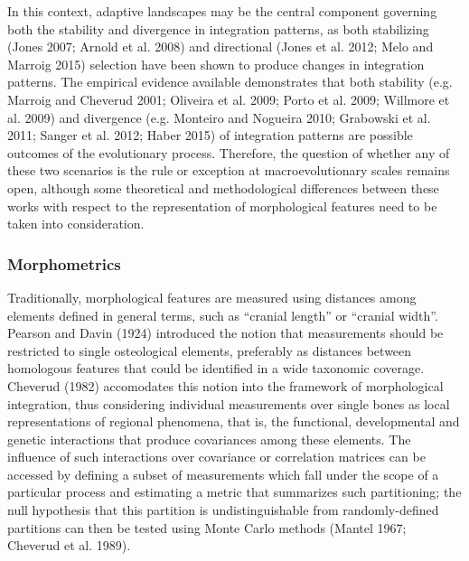 \documentclass[12pt,]{article}
\begin{document}
In this context, adaptive landscapes may be the central component
governing both the stability and divergence in integration patterns, as
both stabilizing (Jones 2007; Arnold et al. 2008) and directional (Jones
et al. 2012; Melo and Marroig 2015) selection have been shown to produce
changes in integration patterns. The empirical evidence available
demonstrates that both stability (e.g. Marroig and Cheverud 2001;
Oliveira et al. 2009; Porto et al. 2009; Willmore et al. 2009) and
divergence (e.g. Monteiro and Nogueira 2010; Grabowski et al. 2011;
Sanger et al. 2012; Haber 2015) of integration patterns are possible
outcomes of the evolutionary process. Therefore, the question of whether
any of these two scenarios is the rule or exception at macroevolutionary
scales remains open, although some theoretical and methodological
differences between these works with respect to the representation of
morphological features need to be taken into consideration.

\subsubsection{Morphometrics}\label{morphometrics}

Traditionally, morphological features are measured using distances among
elements defined in general terms, such as ``cranial length'' or
``cranial width''. Pearson and Davin (1924) introduced the notion that
measurements should be restricted to single osteological elements,
preferably as distances between homologous features that could be
identified in a wide taxonomic coverage. Cheverud (1982) accomodates
this notion into the framework of morphological integration, thus
considering individual measurements over single bones as local
representations of regional phenomena, that is, the functional,
developmental and genetic interactions that produce covariances among
these elements. The influence of such interactions over covariance or
correlation matrices can be accessed by defining a subset of
measurements which fall under the scope of a particular process and
estimating a metric that summarizes such partitioning; the null
hypothesis that this partition is undistinguishable from
randomly-defined partitions can then be tested using Monte Carlo methods
(Mantel 1967; Cheverud et al. 1989).
\end{document}
